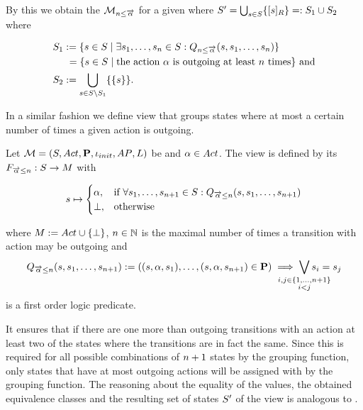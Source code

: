 \documentclass[preview]{standalone}
\begin{document}
By this we obtain the \viewN ${{{{{\mathcal{M}}}}_{{n}\leq{\overrightarrow{\ensuremath{{\alpha}}}}}}}$ for a given \chgphN \chgph where ${S}' = \bigcup_{{s} \in {S}} \{{{[{s}]_{{R}}}}\} =: {S}_1 \cup {S}_2$ where 

\begin{align*}
	\states_1 &:= \{\state \in \states \mid \exists \state_1, \dots, \state_\numoutact \in \states: \predminoutact\} \\ %
	&\hspace{1.15mm}= \{\state \in \states \mid \text{the action } \action \text{ is outgoing at least } \numoutact \text{ times} \} \text{ and} \\
	\states_2 &:= \remstates.	
\end{align*}

In a similar fashion we define view that groups states where at most a certain number of times a given action is outgoing. 

\begin{definition}
	Let ${{{\mathcal{M}}}} = {{({S}, {Act}, {\textbf{P}}, {\iota_{init}}, {AP}, {L})}}$ be \achgphN and ${\alpha} \in {Act}$. The view \viewmaxoutaction is defined by its \grpfctN ${{F_{{\overrightarrow{{\alpha}}}\leq{n}}}} : {S} \to {M}$ with
	
	\[
	{s} \mapsto
	\begin{cases}
		{\alpha},				& \text{if } \forall {s}_1, \dots, {s}_{{n}+1} \in {S}: {Q_{{\overrightarrow{{\alpha}}}\leq{n}}({s},{s}_1, \dots, {s}_{{n}+1})} \\
		{\bot},          	& \text{otherwise}
	\end{cases}
	\]
	
	where ${{M}} := {Act} \cup {\{\bot\}}$, ${n} \in {\mathbb{N}}$ is the maximal number of times a transition with action \action may be outgoing and 
	\[
	\predmaxoutact := ((\state, \action, \state_1), \dots, (\state, \action, \state_{\numoutact+1}) \in \trans) \implies \bigvee_{\mathclap{\substack{i,j \in \{1,\dots, \numoutact+1\} \\ i < j}}} \state_i = \state_j
	\]
	is a first order logic predicate.
	\label{def:viewmaxoutaction}
\end{definition}

 It ensures that if there are one more than \numoutact outgoing transitions with an action \action at least two of the states where the transitions  are in fact the same. Since this is required for all possible combinations of ${n} + 1$ states by the grouping function, only states that have at most \numoutact outgoing actions will be assigned with \action by the grouping function. The reasoning about the equality of the \grpfctN values, the obtained equivalence classes and the resulting set of states ${S}'$ of the view is analogous to \viewminoutaction.
\end{document}
